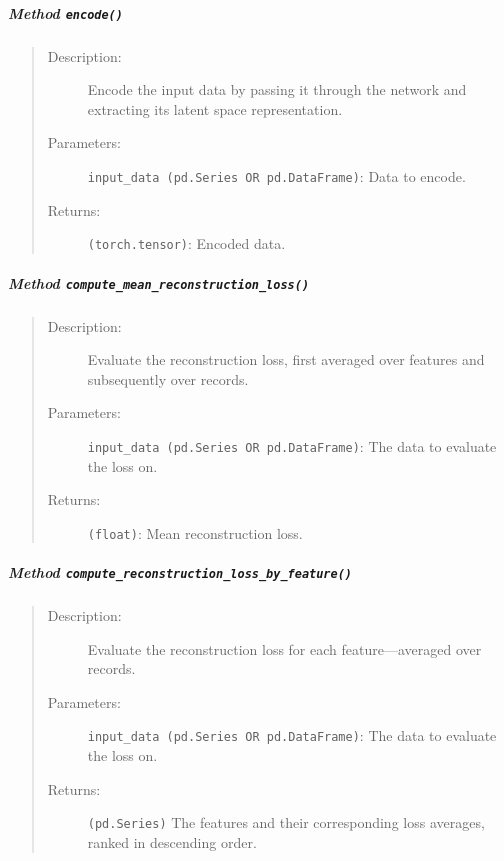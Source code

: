 \documentclass[a4paper, 10pt]{article}
\theoremstyle{plain}
\theoremstyle{definition}
\numberwithin{equation}{section}
\begin{document}
\subparagraph{Method \texttt{encode()}}
\begin{quote}
    \begin{description}
        \item[Description:] Encode the input data by passing it through the network and extracting its latent space representation.
        \item[Parameters:] \texttt{input\_data (pd.Series OR pd.DataFrame)}: Data to encode.
        \item[Returns:] \texttt{(torch.tensor)}: Encoded data.
    \end{description}
\end{quote}

\subparagraph{Method \texttt{compute\_mean\_reconstruction\_loss()}}
\begin{quote}
    \begin{description}
        \item[Description:] Evaluate the reconstruction loss, first averaged over features and subsequently over records.
        \item[Parameters:] \texttt{input\_data (pd.Series OR pd.DataFrame)}: The data to evaluate the loss on.
        \item[Returns:] \texttt{(float)}: Mean reconstruction loss.
    \end{description}
\end{quote}

\subparagraph{Method \texttt{compute\_reconstruction\_loss\_by\_feature()}}
\begin{quote}
    \begin{description}
        \item[Description:] Evaluate the reconstruction loss for each feature---averaged over records.
        \item[Parameters:] \texttt{input\_data (pd.Series OR pd.DataFrame)}: The data to evaluate the loss on.
        \item[Returns:] \texttt{(pd.Series)} The features and their corresponding loss averages, ranked in descending order.
    \end{description}
\end{quote}
\end{document}
